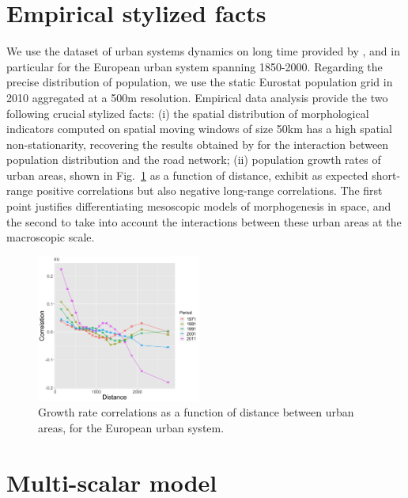 \documentclass[a4paper,twocolumn,twoside,10pt]{article}
\theoremstyle{definition}
\begin{document}
\section{Empirical stylized facts}

We use the dataset of urban systems dynamics on long time provided by \cite{pumain2015multilevel}, and in particular for the European urban system spanning 1850-2000. Regarding the precise distribution of population, we use the static Eurostat population grid in 2010 aggregated at a 500m resolution. Empirical data analysis provide the two following crucial stylized facts: (i) the spatial distribution of morphological indicators computed on spatial moving windows of size 50km has a high spatial non-stationarity, recovering the results obtained by \cite{raimbault2018urban} for the interaction between population distribution and the road network; (ii) population growth rates of urban areas, shown in Fig.~\ref{fig:empcorrs} as a function of distance, exhibit as expected short-range positive correlations but also negative long-range correlations. The first point justifies differentiating mesoscopic models of morphogenesis in space, and the second to take into account the interactions between these urban areas at the macroscopic scale.


\begin{figure}[htp]
\centering
\includegraphics[width=0.48\textwidth]{figures/corrsdist_EU_quantiles21_periods5.png}
\caption{Growth rate correlations as a function of distance between urban areas, for the European urban system.}
\label{fig:empcorrs}
\end{figure}




\section{Multi-scalar model}

\cite{raimbault2018indirect}
\cite{raimbault2018calibration}
\end{document}
